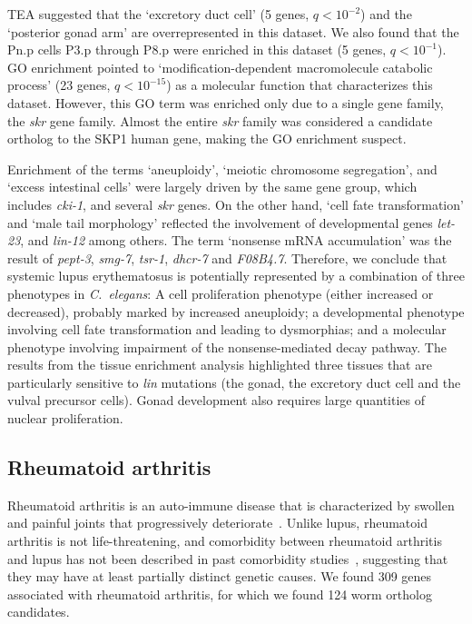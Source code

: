 \documentclass[10pt, onecolumn]{article}
\newcommand{\cel}{\emph{C.~elegans}}
\newcommand{\harthritis}{309}
\newcommand{\warthritis}{124}
\newcommand{\qval}[1]{\ensuremath{q<10^{-#1}}}
\begin{document}
TEA suggested that the `excretory duct cell' (5 genes, \qval{2}) and the
`posterior gonad arm' are overrepresented in this dataset. We also found that
the Pn.p cells P3.p through P8.p were enriched in this dataset (5 genes,
\qval{1}). GO enrichment pointed to `modification-dependent macromolecule
catabolic process' (23 genes, \qval{15}) as a molecular function that
characterizes this dataset. However, this GO term was enriched only due to a
single gene family, the \emph{skr} gene family. Almost the entire \emph{skr}
family was considered a candidate ortholog to the SKP1 human gene, making the GO
enrichment suspect.

Enrichment of the terms `aneuploidy', `meiotic chromosome segregation', and
`excess intestinal cells' were largely driven by the same gene group, which
includes \emph{cki-1}, and several \emph{skr} genes. On the other hand, `cell
fate transformation' and `male tail morphology' reflected the involvement of
developmental genes \emph{let-23}, and \emph{lin-12} among others. The term
`nonsense mRNA accumulation' was the result of \emph{pept-3}, \emph{smg-7},
\emph{tsr-1}, \emph{dhcr-7} and \emph{F08B4.7}. Therefore, we conclude that
systemic lupus erythematosus is potentially represented by a combination of
three phenotypes in \cel{}: A cell proliferation phenotype (either increased or
decreased), probably marked by increased aneuploidy; a developmental phenotype
involving cell fate transformation and leading to dysmorphias; and a molecular
phenotype involving impairment of the nonsense-mediated decay pathway.
The results from the tissue enrichment analysis
highlighted three tissues that are particularly sensitive to \emph{lin}
mutations (the gonad, the excretory duct cell and the vulval precursor cells).
Gonad development also requires large quantities of nuclear proliferation.

\subsection*{Rheumatoid arthritis}
Rheumatoid arthritis is an auto-immune disease that is characterized by swollen
and painful joints that progressively deteriorate~\cite{Smolen2016}. Unlike
lupus, rheumatoid arthritis is not life-threatening, and comorbidity between
rheumatoid arthritis and lupus has not been described in past comorbidity
studies~\cite{Dougados2013}, suggesting that they may have at least partially
distinct genetic causes. We found \harthritis{} genes associated with rheumatoid
arthritis, for which we found \warthritis{} worm ortholog candidates.
\end{document}
